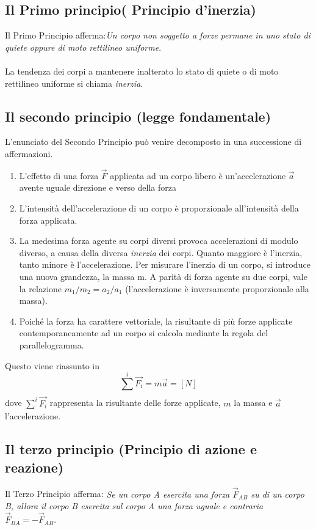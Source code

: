 \documentclass{article}
\begin{document}
\subsection{Il Primo principio( Principio d'inerzia)}
Il Primo Principio afferma:\textit{Un corpo non soggetto a forze permane in uno stato di quiete oppure di
moto rettilineo uniforme}.\\
\\
La tendenza dei corpi a mantenere inalterato lo stato di quiete o di moto rettilineo uniforme si
chiama \textit{inerzia}.
\subsection{Il secondo principio (legge fondamentale)}
L'enunciato del Secondo Principio può venire decomposto in una successione di affermazioni.
\begin{enumerate}
    \item L'effetto di una forza \(\Vec{F}\) applicata ad un corpo libero è un'accelerazione \(\Vec{a}\)  avente uguale
    direzione e verso della forza
    \item L'intensità dell'accelerazione di un corpo è proporzionale all'intensità della forza applicata.
    \item La medesima forza agente su corpi diversi provoca accelerazioni di modulo diverso, a causa
    della diversa \textit{inerzia} dei corpi. Quanto maggiore è l'inerzia, tanto minore è
    l'accelerazione. Per misurare l'inerzia di un corpo, si introduce una nuova grandezza, la massa
    m. A parità di forza agente su due corpi, vale la relazione \(m_1/m_2 = a_2/a_1\) (l'accelerazione è
    inversamente proporzionale alla massa).
    \item Poiché la forza ha carattere vettoriale, la risultante di più forze applicate contemporaneamente
    ad un corpo si calcola mediante la regola del parallelogramma.
\end{enumerate}
Questo viene riassunto in 
\[
\sum_{}^{i} \Vec{F_i} = m\Vec{a} = [N]
\]
dove \(\sum_{}^{i} \Vec{F_i}\) rappresenta la risultante delle forze applicate, \(m\) la massa e \(\Vec{a}\) l'accelerazione.
\subsection{Il terzo principio (Principio di azione e reazione)}
Il Terzo Principio afferma: \textit{Se un corpo A esercita una forza \(\Vec{F}_{AB}\) su di un corpo B, allora il corpo
B esercita sul corpo A una forza uguale e contraria \(\Vec{F}_{BA} = - \Vec{F}_{AB}\)}.
\end{document}
